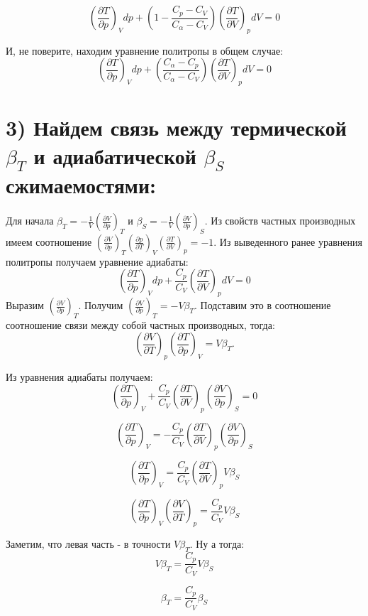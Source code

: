\documentclass[a4paper,12pt]{article}
\begin{document}
    \[ \left(\frac{\partial T}{\partial p}\right)_{V}dp + \left(1 - \frac{C_{p} - C_{V}}{C_{\alpha} - C_{V}}\right)\left(\frac{\partial T}{\partial V}\right)_{p}dV = 0 \]

    И, не поверите, находим уравнение политропы в общем случае:
    \[ \left(\frac{\partial T}{\partial p}\right)_{V}dp + \left(\frac{C_{\alpha} - C_{p}}{C_{\alpha} - C_{V}}\right)\left(\frac{\partial T}{\partial V}\right)_{p}dV = 0 \]

    \section*{3) Найдем связь между термической $\beta_{T}$ и адиабатической $\beta_{S}$ сжимаемостями:}
    Для начала $\beta_{T} = -\frac{1}{V}\left(\frac{\partial V}{\partial p}\right)_{T}$ и $\beta_{S} = -\frac{1}{V}\left(\frac{\partial V}{\partial p}\right)_{S}.$
    \newline
    Из свойств частных производных имеем соотношение 
    $\left(\frac{\partial V}{\partial p}\right)_{T}\left(\frac{\partial p}{\partial T}\right)_{V}\left(\frac{\partial T}{\partial V}\right)_{p} = -1.$
    Из выведенного ранее уравнения политропы получаем уравнение адиабаты:
    \[ \left(\frac{\partial T}{\partial p}\right)_{V}dp + \frac{C_{p}}{C_{V}}\left(\frac{\partial T}{\partial V}\right)_{p}dV = 0 \]
    Выразим $\left(\frac{\partial V}{\partial p}\right)_{T}.$  Получим $\left(\frac{\partial V}{\partial p}\right)_{T} = -V\beta_{T}$. Подставим это в соотношение соотношение связи между собой частных производных, тогда:
    \[ \left(\frac{\partial V}{\partial T}\right)_{p}\left(\frac{\partial T}{\partial p}\right)_{V} = V\beta_{T}.\]

    Из уравнения адиабаты получаем:
    \[ \left(\frac{\partial T}{\partial p}\right)_{V} + \frac{C_{p}}{C_{V}}\left(\frac{\partial T}{\partial V}\right)_{p}\left(\frac{\partial V}{\partial p}\right)_{S} = 0 \]

    \[ \left(\frac{\partial T}{\partial p}\right)_{V} = -\frac{C_{p}}{C_{V}}\left(\frac{\partial T}{\partial V}\right)_{p}\left(\frac{\partial V}{\partial p}\right)_{S} \]

    \[ \left(\frac{\partial T}{\partial p}\right)_{V} = \frac{C_{p}}{C_{V}}\left(\frac{\partial T}{\partial V}\right)_{p}V\beta_{S}\]

    \[ \left(\frac{\partial T}{\partial p}\right)_{V}\left(\frac{\partial V}{\partial T}\right)_{p} = \frac{C_{p}}{C_{V}}V\beta_{S}\]

    \newpage
    Заметим, что левая часть - в точности $V\beta_{T}$. Ну а тогда:
    \[ V\beta_{T} = \frac{C_p}{C_V}V\beta_{S} \]

    \[\beta_{T} = \frac{C_p}{C_V}\beta_{S} \]
    
    
\end{document}
